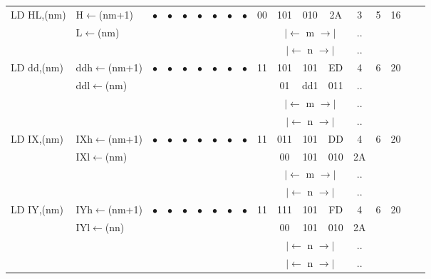 \documentclass[oneside,a4paper]{book}
\newcommand{\instrt}{\rule{0pt}{2.7ex}}
\newcommand{\instrb}{\rule[-1.7ex]{0pt}{0pt}}
\begin{document}
{\begin{tabular}{llcccccccccccccccl}
		LD HL,(nm)\instrt & 
			H$\leftarrow$(nm+1) &
			$\bullet$ & 
				$\bullet$ & 
				$\bullet$ & 
				$\bullet$ & 
				$\bullet$ & 
				$\bullet$ & 
				$\bullet$ & 
			00 & 101 & 010 & 
			2A & 3 & 
			5 & 16 & \\ 
		& L$\leftarrow$(nm) & \multicolumn{8}{c}{} & \multicolumn{3}{c}{$|\longleftarrow$ m $\longrightarrow|$} & .. & & & \\
		\multicolumn{10}{c}{} & \multicolumn{3}{c}{$|\longleftarrow$ n $\longrightarrow|$} & .. & & & \instrb \\

		LD dd,(nm)\instrt & 
			ddh$\leftarrow$(nm+1) &
			$\bullet$ & 
				$\bullet$ & 
				$\bullet$ & 
				$\bullet$ & 
				$\bullet$ & 
				$\bullet$ & 
				$\bullet$ & 
			11 & 101 & 101 & 
			ED & 4 & 
			6 & 20 & \\ 
		& ddl$\leftarrow$(nm) & \multicolumn{8}{c}{} & 01 & dd1 & 011 & .. & & & \\
		\multicolumn{10}{c}{} & \multicolumn{3}{c}{$|\longleftarrow$ m $\longrightarrow|$} & .. & & & \\
		\multicolumn{10}{c}{} & \multicolumn{3}{c}{$|\longleftarrow$ n $\longrightarrow|$} & .. & & & \instrb \\

		LD IX,(nm)\instrt &
			IXh$\leftarrow$(nm+1) &
			$\bullet$ & 
				$\bullet$ & 
				$\bullet$ & 
				$\bullet$ & 
				$\bullet$ & 
				$\bullet$ & 
				$\bullet$ & 
			11 & 011 & 101 & 
			DD & 4 & 
			6 & 20 & \\ 
		& IXl$\leftarrow$(nm) & \multicolumn{8}{c}{} & 00 & 101 & 010 & 2A & & & \\
		\multicolumn{10}{c}{} & \multicolumn{3}{c}{$|\longleftarrow$ m $\longrightarrow|$} & .. & & & \\
		\multicolumn{10}{c}{} & \multicolumn{3}{c}{$|\longleftarrow$ n $\longrightarrow|$} & .. & & & \instrb \\

		LD IY,(nm)\instrt &
			IYh$\leftarrow$(nm+1) &
			$\bullet$ & 
				$\bullet$ & 
				$\bullet$ & 
				$\bullet$ & 
				$\bullet$ & 
				$\bullet$ & 
				$\bullet$ & 
			11 & 111 & 101 & 
			FD & 4 & 
			6 & 20 & \\ 
		& IYl$\leftarrow$(nn) & \multicolumn{8}{c}{} & 00 & 101 & 010 & 2A & & & \\
		\multicolumn{10}{c}{} & \multicolumn{3}{c}{$|\longleftarrow$ n $\longrightarrow|$} & .. & & & \\
		\multicolumn{10}{c}{} & \multicolumn{3}{c}{$|\longleftarrow$ n $\longrightarrow|$} & .. & & & \instrb \\


\end{tabular}}
\end{document}
